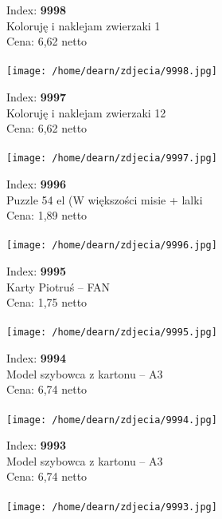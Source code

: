 
{Index: \textbf{9998}\\
Koloruję i naklejam zwierzaki 1 \\
Cena: 6,62 netto   \\\\  \texttt{[image: /home/dearn/zdjecia/9998.jpg]}}\newline\newline

{Index: \textbf{9997}\\
Koloruję i naklejam zwierzaki 12\\
Cena: 6,62 netto   \\\\  \texttt{[image: /home/dearn/zdjecia/9997.jpg]}}\newline\newline

{Index: \textbf{9996}\\
Puzzle 54 el (W większości misie + lalki\\
Cena: 1,89 netto   \\\\  \texttt{[image: /home/dearn/zdjecia/9996.jpg]}}\newline\newline

{Index: \textbf{9995}\\
Karty Piotruś – FAN\\
Cena: 1,75 netto   \\\\  \texttt{[image: /home/dearn/zdjecia/9995.jpg]}}\newline\newline

{Index: \textbf{9994}\\
Model szybowca z kartonu – A3\\
Cena: 6,74 netto   \\\\  \texttt{[image: /home/dearn/zdjecia/9994.jpg]}}\newline\newline

{Index: \textbf{9993}\\
Model szybowca z kartonu – A3\\
Cena: 6,74 netto   \\\\  \texttt{[image: /home/dearn/zdjecia/9993.jpg]}}\newline\newline

